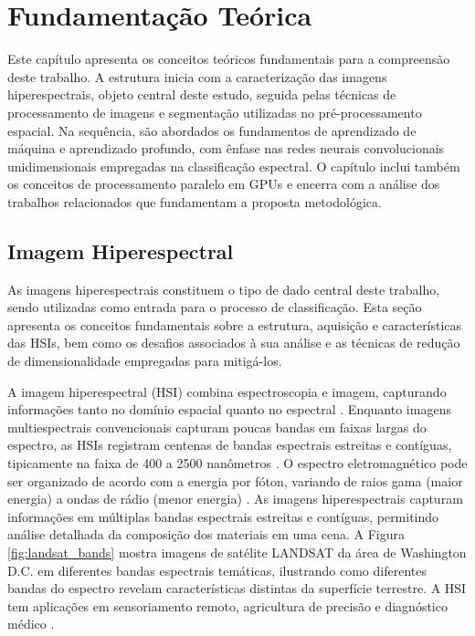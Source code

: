\chapter{Fundamentação Teórica}
\label{cap:fund}

Este capítulo apresenta os conceitos teóricos fundamentais para a compreensão deste trabalho. A estrutura inicia com a caracterização das imagens hiperespectrais, objeto central deste estudo, seguida pelas técnicas de processamento de imagens e segmentação utilizadas no pré-processamento espacial. Na sequência, são abordados os fundamentos de aprendizado de máquina e aprendizado profundo, com ênfase nas redes neurais convolucionais unidimensionais empregadas na classificação espectral. O capítulo inclui também os conceitos de processamento paralelo em GPUs e encerra com a análise dos trabalhos relacionados que fundamentam a proposta metodológica.

\section{Imagem Hiperespectral}

As imagens hiperespectrais constituem o tipo de dado central deste trabalho, sendo utilizadas como entrada para o processo de classificação. Esta seção apresenta os conceitos fundamentais sobre a estrutura, aquisição e características das HSIs, bem como os desafios associados à sua análise e as técnicas de redução de dimensionalidade empregadas para mitigá-los.

A imagem hiperespectral (HSI) combina espectroscopia e imagem, capturando informações tanto no domínio espacial quanto no espectral \cite{Li2019DeepLF}. Enquanto imagens multiespectrais convencionais capturam poucas bandas em faixas largas do espectro, as HSIs registram centenas de bandas espectrais estreitas e contíguas, tipicamente na faixa de 400 a 2500 nanômetros \cite{Qian2020}. O espectro eletromagnético pode ser organizado de acordo com a energia por fóton, variando de raios gama (maior energia) a ondas de rádio (menor energia) \cite{gonzalez2018digital}. As imagens hiperespectrais capturam informações em múltiplas bandas espectrais estreitas e contíguas, permitindo análise detalhada da composição dos materiais em uma cena. A Figura \ref{fig:landsat_bands} mostra imagens de satélite LANDSAT da área de Washington D.C. em diferentes bandas espectrais temáticas, ilustrando como diferentes bandas do espectro revelam características distintas da superfície terrestre. A HSI tem aplicações em sensoriamento remoto, agricultura de precisão e diagnóstico médico \cite{Lurs12162659}.

